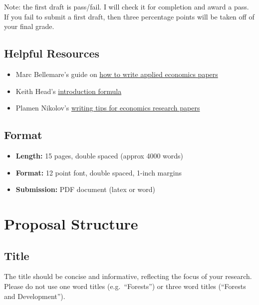\documentclass[
]{article}
\providecommand{\tightlist}{%
  \setlength{\itemsep}{0pt}\setlength{\parskip}{0pt}}
\begin{document}
Note: the first draft is pass/fail. I will check it for completion and award a pass. If you fail to submit a first draft, then three percentage points will be taken off of your final grade.

\hypertarget{helpful-resources}{%
\subsection{Helpful Resources}\label{helpful-resources}}

\begin{itemize}
\tightlist
\item
  Marc Bellemare's guide on \href{https://marcfbellemare.com/wordpress/wp-content/uploads/2020/09/BellemareHowToPaperSeptember2020.pdf}{how to write applied economics papers}
\item
  Keith Head's \href{https://blogs.ubc.ca/khead/research/research-advice/formula}{introduction formula}
\item
  Plamen Nikolov's \href{https://docs.iza.org/dp15057.pdf}{writing tips for economics research papers}
\end{itemize}

\hypertarget{format}{%
\subsection{Format}\label{format}}

\begin{itemize}
\item
  \textbf{Length:} 15 pages, double spaced (approx 4000 words)
\item
  \textbf{Format:} 12 point font, double spaced, 1-inch margins
\item
  \textbf{Submission:} PDF document (latex or word)
\end{itemize}

\newpage

\hypertarget{proposal-structure}{%
\section{Proposal Structure}\label{proposal-structure}}

\hypertarget{title}{%
\subsection{Title}\label{title}}

The title should be concise and informative, reflecting the focus of your research. Please do not use one word titles (e.g.~``Forests'') or three word titles (``Forests and Development'').
\end{document}
